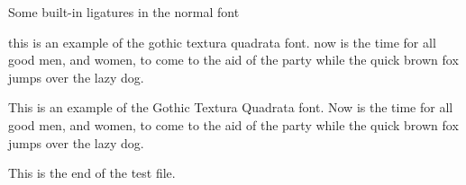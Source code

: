 \documentclass{article}
\newcommand{\sentence}{%
this is an example of the gothic textura quadrata font. now is the time for all good
men, and women, to come to the aid of the party while the quick brown fox
jumps over the lazy dog.}
\newcommand{\Sentence}{%
This is an example of the Gothic Textura Quadrata font. Now is the time for all good
men, and women, to come to the aid of the party while the quick brown fox
jumps over the lazy dog.}
\newcommand{\esses}{sa sb sc sd se sf sg sh si sj sk sl sm 
                    sn so sp sq sr ss st su sv sw sx sy sz}
\newcommand{\exes}{xa xb xc xd xe xf xg xh xi xj xk xl xm 
                  xn xo xp xq xr xs xt xu xv xw xx xy xz}
\newcommand{\jays}{aj bj cj dj ej fj gj hj ij jj kj lj mj 
                   nj oj pj qj rj sj tj uj vj wj xj yj zj}
\newcommand{\dees}{ad bd cd dd ed fd gd hd id jd kd ld md 
                   nd od pd qd rd sd td ud vd wd xd yd zd}
\newcommand{\ares}{ra rb rc rd re rf rg rh ri rj rk rl rm 
                   rn ro rp rq rr rs rt ru rv rw rx ry rz}
\newcommand{\Esses}{SA SB SC SD SE SF SG SH SI SJ SK SL SM 
                    SN SO SP SQ SR SS ST SU SV SW SX SY SZ}
\newcommand{\Exes}{XA XB XC XD XE XF XG XH XI XJ XK XL XM 
                  XN XO XP XQ XR XS XT XU XV XW XX XY XZ}
\newcommand{\Jays}{AJ BJ CJ DJ EJ FJ GJ HJ IJ JJ KJ LJ MJ 
                   NJ OJ PJ QJ RJ SJ TJ UJ VJ WJ XJ YJ ZJ}
\newcommand{\Dees}{AD BD CD DD ED FD GD HD ID JD KD LD MD 
                   ND OD PD QD RD SD TD UD VD WD XD YD ZD}
\newcommand{\Ares}{RA RB RC RD RE RF RG RH RI RJ RK RL RM 
                   RN RO RP RQ RR RS RT RU RV RW RX RY RZ}
\begin{document}
\begin{center}
    Some built-in ligatures in the normal font \\
\end{center}


{
\tgothfamily 
\sentence{}

\Sentence{}
}
    
    This is the end of the test file.
\end{document}
